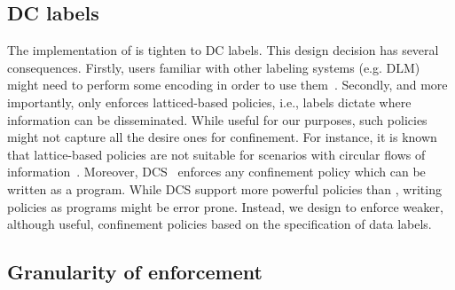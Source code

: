 
\subsection{DC labels}

The implementation of \sys{} is tighten to DC labels. This design decision has
several consequences. Firstly, users familiar with other labeling systems
(e.g. DLM) might need to perform some encoding in order to use
them~\cite{GenLabels}.  Secondly, and more importantly, \sys{} only enforces
latticed-based policies, i.e., labels dictate where information can be
disseminated.  While useful for our purposes, such policies might not capture
all the desire ones for confinement. For instance, it is known that
lattice-based policies are not suitable for scenarios with circular flows of
information~\cite{Badger:1995}. Moreover, DCS~\cite{Akhawe2013} enforces any
confinement policy which can be written as a program. While DCS support more
powerful policies than \sys{}, writing policies as programs might be error
prone. Instead, we design \sys{} to enforce weaker, although useful,
confinement policies based on the specification of data labels. 

\subsection{Granularity of enforcement } 






